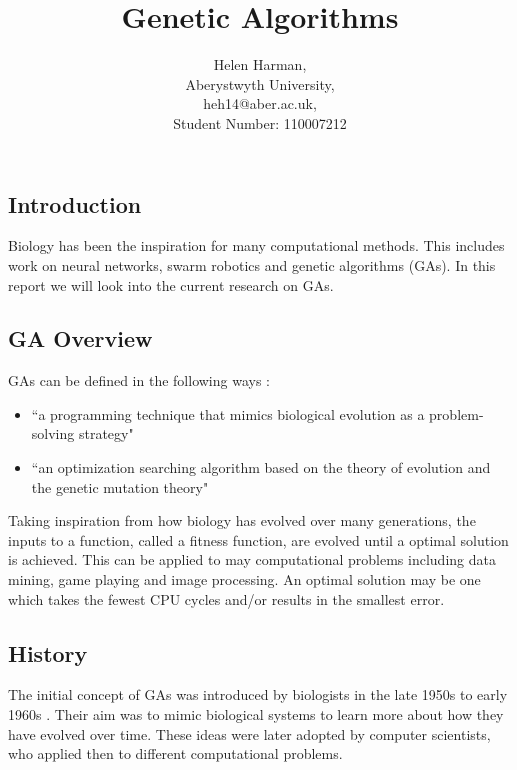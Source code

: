 \documentclass[10pt,a4paper,openbib]{article}
\author{Helen Harman, \\Aberystwyth University, \\heh14@aber.ac.uk,\\ Student Number: 110007212}
\title{Genetic Algorithms}
\begin{document}
\maketitle

\section*{\vspace{-1.2cm} }

\begin{multicols}{2}
\section{Introduction}
Biology has been the inspiration for many computational methods. This includes work on neural networks, swarm robotics and genetic algorithms (GAs). In this report we will look into the current research on GAs. 

\subsection{GA Overview}

\noindent GAs can be defined in the following ways : 
\begin{itemize}
\item ``a programming technique that mimics biological evolution as a problem-solving strategy" \cite{geneticsWebsite}
\item ``an optimization searching algorithm based on the theory of evolution and the genetic mutation theory" \cite{IB_GA}
\end{itemize}

\noindent Taking inspiration from how biology has evolved over many generations, the inputs to a function, called a fitness function, are evolved until a optimal solution is achieved. This can be applied to may computational problems including data mining, game playing and image processing. \cite{geneticsWebsite} An optimal solution may be one which takes the fewest CPU cycles and/or results in the smallest error.

\subsection{History}
The initial concept of GAs was introduced by biologists in the late 1950s to early 1960s \cite{geneticsWebsite}. Their aim was to mimic biological systems to learn more about how they have evolved over time. These ideas were later adopted by computer scientists, who applied then to different computational problems. \\


\end{multicols}
\end{document}
